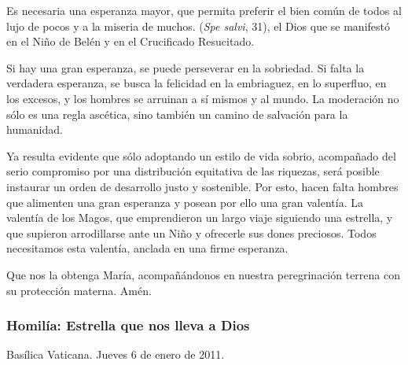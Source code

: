 \begin{body}
\begin{body}
{Es necesaria una esperanza mayor, que permita preferir el bien común de todos al lujo de pocos y a la miseria de muchos.  (\emph{Spe salvi}, 31), el Dios que se manifestó en el Niño de Belén y en el Crucificado Resucitado.

Si hay una gran esperanza, se puede perseverar en la sobriedad. Si falta la verdadera esperanza, se busca la felicidad en la embriaguez, en lo superfluo, en los excesos, y los hombres se arruinan a sí mismos y al mundo. La moderación no sólo es una regla ascética, sino también un camino de salvación para la humanidad.

Ya resulta evidente que sólo adoptando un estilo de vida sobrio, acompañado del serio compromiso por una distribución equitativa de las riquezas, será posible instaurar un orden de desarrollo justo y sostenible. Por esto, hacen falta hombres que alimenten una gran esperanza y posean por ello una gran valentía. La valentía de los Magos, que emprendieron un largo viaje siguiendo una estrella, y que supieron arrodillarse ante un Niño y ofrecerle sus dones preciosos. Todos necesitamos esta valentía, anclada en una firme esperanza.

Que nos la obtenga María, acompañándonos en nuestra peregrinación terrena con su protección materna. Amén.

\subsubsection{Homilía: Estrella que nos lleva a Dios}

Basílica Vaticana. Jueves 6 de enero de 2011.

}
\end{body}
\end{body}
